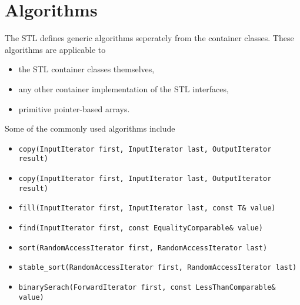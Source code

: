 \section{Algorithms}

The STL defines generic algorithms seperately from the container classes.
These algorithms are applicable to
\begin{itemize}
 \item the STL container classes themselves,
 \item any other container implementation of the STL interfaces,
 \item primitive pointer-based arrays.
\end{itemize}

 Some of the commonly used algorithms include
 \begin{itemize}
   \item \verb+copy(InputIterator first, InputIterator last, OutputIterator result)+ 
   \item \verb+copy(InputIterator first, InputIterator last, OutputIterator result)+ 
   \item \verb+fill(InputIterator first, InputIterator last, const T& value)+ 
   \item \verb+find(InputIterator first, const EqualityComparable& value)+ 
   \item \verb+sort(RandomAccessIterator first, RandomAccessIterator last)+ 
   \item \verb+stable_sort(RandomAccessIterator first, RandomAccessIterator last)+
   \item \verb+binarySerach(ForwardIterator first, const LessThanComparable& value)+ 
\end{itemize}

